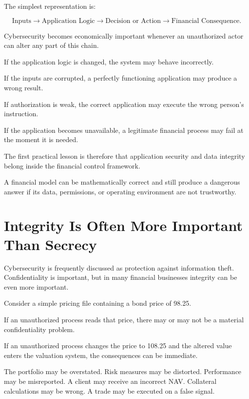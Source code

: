 The simplest representation is:

\begin{equation}
\text{Inputs}
\rightarrow
\text{Application Logic}
\rightarrow
\text{Decision or Action}
\rightarrow
\text{Financial Consequence}.
\end{equation}

Cybersecurity becomes economically important whenever an unauthorized actor can alter any part of this chain.

If the application logic is changed, the system may behave incorrectly.

If the inputs are corrupted, a perfectly functioning application may produce a wrong result.

If authorization is weak, the correct application may execute the wrong person's instruction.

If the application becomes unavailable, a legitimate financial process may fail at the moment it is needed.

The first practical lesson is therefore that application security and data integrity belong inside the financial control framework.

\begin{intuition}
A financial model can be mathematically correct and still produce a dangerous answer if its data, permissions, or operating environment are not trustworthy.
\end{intuition}

\section{Integrity Is Often More Important Than Secrecy}

Cybersecurity is frequently discussed as protection against information theft. Confidentiality is important, but in many financial businesses integrity can be even more important.

Consider a simple pricing file containing a bond price of 98.25.

If an unauthorized process reads that price, there may or may not be a material confidentiality problem.

If an unauthorized process changes the price to 108.25 and the altered value enters the valuation system, the consequences can be immediate.

The portfolio may be overstated. Risk measures may be distorted. Performance may be misreported. A client may receive an incorrect NAV. Collateral calculations may be wrong. A trade may be executed on a false signal.

